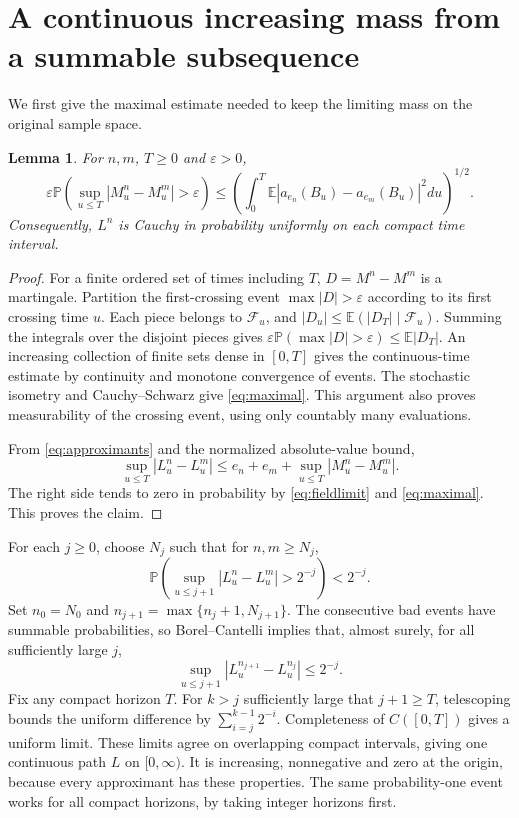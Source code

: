 \documentclass[11pt]{article}
\newtheorem{lemma}[theorem]{Lemma}
\newcommand{\E}{\mathbb E}
\newcommand{\Pp}{\mathbb P}
\newcommand{\F}{\mathcal F}
\begin{document}
\section{A continuous increasing mass from a summable subsequence}
We first give the maximal estimate needed to keep the limiting mass
on the original sample space.

\begin{lemma}\label{lem:maximal}
For $n,m$, $T\geq0$ and $\varepsilon>0$,
\begin{equation}\label{eq:maximal}
 \varepsilon\Pp\left(\sup_{u\leq T}|M_u^n-M_u^m|>
 \varepsilon\right)
 \leq \left(\int_0^T\E|a_{e_n}(B_u)-a_{e_m}(B_u)|^2du\right)^{1/2}.
\end{equation}
Consequently, $L^n$ is Cauchy in probability uniformly on each compact
time interval.
\end{lemma}
\begin{proof}
For a finite ordered set of times including $T$, $D=M^n-M^m$ is a
martingale. Partition the first-crossing event $\max|D|>
\varepsilon$ according to its first crossing time $u$. Each piece
belongs to $\F_u$, and
$|D_u|\leq\E(|D_T|\mid\F_u)$. Summing the integrals over the disjoint
pieces gives
$\varepsilon\Pp(\max|D|>\varepsilon)\leq\E|D_T|$.
An increasing collection of finite sets dense in $[0,T]$ gives the
continuous-time estimate by continuity and monotone convergence of
events. The stochastic isometry and Cauchy--Schwarz give
\eqref{eq:maximal}. This argument also proves measurability of the
crossing event, using only countably many evaluations.

From \eqref{eq:approximants} and the normalized absolute-value bound,
\begin{equation}\label{eq:massdifference}
 \sup_{u\leq T}|L_u^n-L_u^m|
 \leq e_n+e_m+\sup_{u\leq T}|M_u^n-M_u^m|.
\end{equation}
The right side tends to zero in probability by
\eqref{eq:fieldlimit} and \eqref{eq:maximal}. This proves the claim.
\end{proof}

For each $j\geq0$, choose $N_j$ such that for $n,m\geq N_j$,
\[
 \Pp\left(\sup_{u\leq j+1}|L_u^n-L_u^m|>2^{-j}\right)<2^{-j}.
\]
Set $n_0=N_0$ and $n_{j+1}=\max\{n_j+1,N_{j+1}\}$.
The consecutive bad events have summable probabilities, so
Borel--Cantelli implies that, almost surely, for all sufficiently
large $j$,
\begin{equation}\label{eq:fast}
 \sup_{u\leq j+1}|L_u^{n_{j+1}}-L_u^{n_j}|\leq2^{-j}.
\end{equation}
Fix any compact horizon $T$. For $k>j$ sufficiently large that
$j+1\geq T$, telescoping bounds the uniform difference by
$\sum_{i=j}^{k-1}2^{-i}$. Completeness of $C([0,T])$ gives a uniform
limit. These limits agree on overlapping compact intervals, giving
one continuous path $L$ on $[0,\infty)$. It is increasing,
nonnegative and zero at the origin, because every approximant has
these properties. The same probability-one event works for all
compact horizons, by taking integer horizons first.
\end{document}
